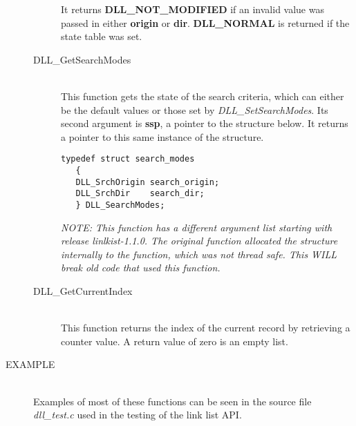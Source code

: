 \documentclass[10pt,letterpaper,titlepage]{article}
\begin{document}
\begin{description}
\begin{description}
 It returns \textbf{DLL\_NOT\_MODIFIED} if an invalid value was passed in either \textbf{origin} or \textbf{dir}.  \textbf{DLL\_NORMAL} is returned if the state table was set.

\item[DLL\_GetSearchModes]\quad\\
 This function gets the state of the search criteria, which can either be the default values or those set by \emph{DLL\_SetSearchModes}.  Its second argument is \textbf{ssp}, a pointer to the structure below.  It returns a pointer to this same instance of the structure.

\begin{verbatim}
typedef struct search_modes
   {
   DLL_SrchOrigin search_origin;
   DLL_SrchDir    search_dir;
   } DLL_SearchModes;
\end{verbatim}

\emph{NOTE: This function has a different argument list starting with release linlkist-1.1.0.  The original function allocated the structure internally to the function, which was not thread safe.  This WILL break old code that used this function.}

\item[DLL\_GetCurrentIndex]\quad\\
 This function returns the index of the current record by retrieving a counter value.  A return value of zero is an empty list.
\end{description}

\item[EXAMPLE]\quad\\
Examples of most of these functions can be seen in the source file \emph{dll\_test.c} used in the testing of the link list API.

\end{description}
\newpage
\end{document}
